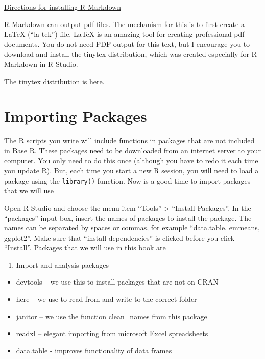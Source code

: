 \documentclass[]{book}
\providecommand{\tightlist}{%
  \setlength{\itemsep}{0pt}\setlength{\parskip}{0pt}}
\begin{document}
\href{https://bookdown.org/yihui/rmarkdown/installation.html\#installation}{Directions for installing R Markdown}

R Markdown can output pdf files. The mechanism for this is to first create a LaTeX (``la-tek'') file. LaTeX is an amazing tool for creating professional pdf documents. You do not need PDF output for this text, but I encourage you to download and install the tinytex distribution, which was created especially for R Markdown in R Studio.

\href{https://yihui.org/tinytex/}{The tinytex distribution is here}.

\hypertarget{importing-packages}{%
\section{Importing Packages}\label{importing-packages}}

The R scripts you write will include functions in packages that are not included in Base R. These packages need to be downloaded from an internet server to your computer. You only need to do this once (although you have to redo it each time you update R). But, each time you start a new R session, you will need to load a package using the \texttt{library()} function. Now is a good time to import packages that we will use

Open R Studio and choose the menu item ``Tools'' \textgreater{} ``Install Packages''. In the ``packages'' input box, insert the names of packages to install the package. The names can be separated by spaces or commas, for example ``data.table, emmeans, ggplot2''. Make sure that ``install dependencies'' is clicked before you click ``Install''. Packages that we will use in this book are

\begin{enumerate}
\def\labelenumi{\arabic{enumi}.}
\tightlist
\item
  Import and analysis packages
\end{enumerate}

\begin{itemize}
\tightlist
\item
  devtools -- we use this to install packages that are not on CRAN
\item
  here -- we use to read from and write to the correct folder
\item
  janitor -- we use the function clean\_names from this package
\item
  readxl -- elegant importing from microsoft Excel spreadsheets
\item
  data.table - improves functionality of data frames
\end{itemize}
\end{document}
